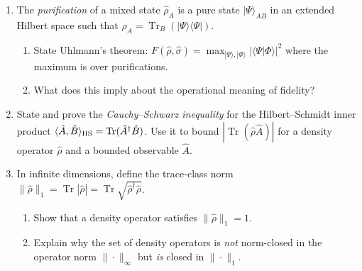 \documentclass[11pt,a4paper]{article}
\begin{document}
\begin{tcolorbox}[gradconceptbox, title={Part II --- Functional-Analytic Probes \hfill\normalfont 5 $\times$ 2 pts = 10 pts}]

\begin{enumerate}[leftmargin=1.8em, label=\textbf{Q\arabic*.}, itemsep=10pt, start=6]

\item {}
  The \emph{purification} of a mixed state $\hat{\rho}_A$ is a pure state
  $|\Psi\rangle_{AB}$ in an extended Hilbert space such that
  $\hat{\rho}_A=\operatorname{Tr}_B(|\Psi\rangle\langle\Psi|)$.
  \begin{enumerate}[label=(\alph*)]
    \item State Uhlmann's theorem: $F(\hat{\rho},\hat{\sigma})=\max_{|\Psi\rangle,|\Phi\rangle}|\langle\Psi|\Phi\rangle|^2$
          where the maximum is over purifications.
    \item What does this imply about the operational meaning of fidelity?
  \end{enumerate}

  \vspace{2cm}

\item {}
  State and prove the \emph{Cauchy--Schwarz inequality} for the Hilbert--Schmidt
  inner product $\langle\hat{A},\hat{B}\rangle_{\rm HS}=\operatorname{Tr}(\hat{A}^\dagger\hat{B})$.
  Use it to bound $|\operatorname{Tr}(\hat{\rho}\hat{A})|$ for a density operator $\hat{\rho}$
  and a bounded observable $\hat{A}$.

  \vspace{2.5cm}

\item {}
  In infinite dimensions, define the trace-class norm
  $\|\hat{\rho}\|_1=\operatorname{Tr}|\hat{\rho}|=\operatorname{Tr}\sqrt{\hat{\rho}^\dagger\hat{\rho}}$.
  \begin{enumerate}[label=(\alph*)]
    \item Show that a density operator satisfies $\|\hat{\rho}\|_1=1$.
    \item Explain why the set of density operators is \emph{not} norm-closed in the operator
          norm $\|\cdot\|_\infty$ but \emph{is} closed in $\|\cdot\|_1$.
  \end{enumerate}

  \vspace{2.5cm}


\end{enumerate}
\end{tcolorbox}
\end{document}
